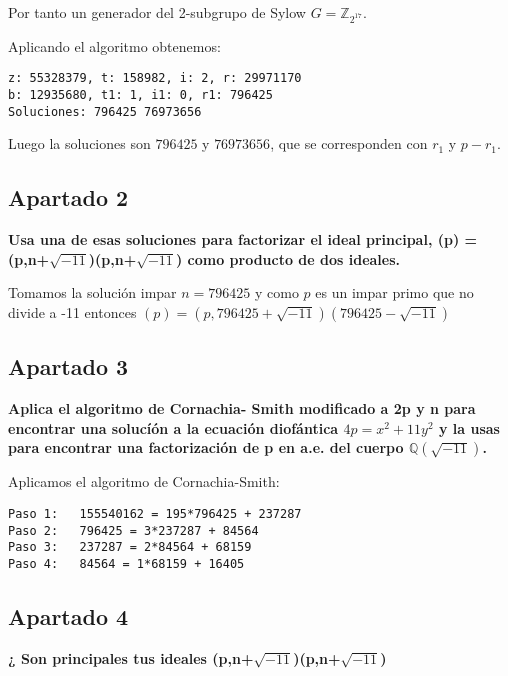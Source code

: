 \documentclass[a4paper]{article}
\begin{document}
Por tanto un generador del 2-subgrupo de Sylow $G=\mathbb{Z}_{2^{17}}$.

Aplicando el algoritmo obtenemos:

\begin{verbatim}
z: 55328379, t: 158982, i: 2, r: 29971170
b: 12935680, t1: 1, i1: 0, r1: 796425
Soluciones: 796425 76973656
\end{verbatim}

Luego la soluciones son $796425$ y $76973656$, que se corresponden con $r_1$ y $p-r_1$.

\subsection{Apartado 2}
\textbf{Usa una de esas soluciones para factorizar el ideal principal, (p) =(p,n+$\sqrt{-11}$)(p,n+$\sqrt{-11}$) como producto de dos ideales.}

Tomamos la solución impar $n=796425$ y como $p$ es un impar primo que no divide a -11 entonces $(p)=\left(p, 796425+\sqrt{-11}\right)\left(796425-\sqrt{-11}\right)$

\subsection{Apartado 3}
\textbf{Aplica el algoritmo de Cornachia- Smith modificado a 2p y n para encontrar una solucíón a la ecuación diofántica $4p =x^2 + 11y^2$ y la usas para encontrar una factorización de p en a.e. del cuerpo $\mathbb{Q}(\sqrt{-11})$.}

Aplicamos el algoritmo de Cornachia-Smith:

\begin{verbatim}
Paso 1:   155540162 = 195*796425 + 237287
Paso 2:   796425 = 3*237287 + 84564
Paso 3:   237287 = 2*84564 + 68159
Paso 4:   84564 = 1*68159 + 16405
\end{verbatim}


\subsection{Apartado 4}
\textbf{¿ Son principales tus ideales (p,n+$\sqrt{-11}$)(p,n+$\sqrt{-11}$)}
\end{document}
